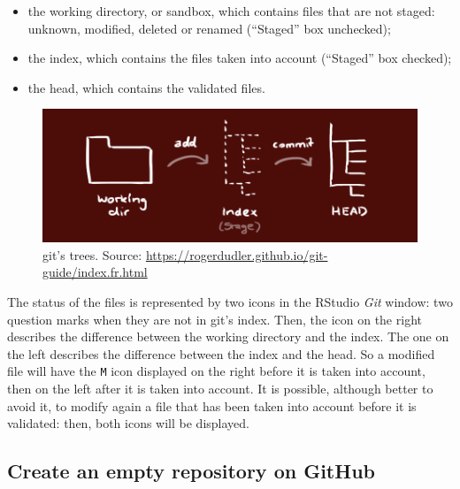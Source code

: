 \documentclass[
  12pt,
  american,
  a4paper,
  extrafontsizes,onecolumn,openright
  ]{memoir}
\providecommand{\tightlist}{%
  \setlength{\itemsep}{0pt}\setlength{\parskip}{0pt}}
\begin{document}
\begin{itemize}
\tightlist
\item
  the working directory, or sandbox, which contains files that are not staged: unknown, modified, deleted or renamed (\enquote{Staged} box unchecked);
\item
  the index, which contains the files taken into account (\enquote{Staged} box checked);
\item
  the head, which contains the validated files.
\end{itemize}



\scriptsize

\begin{figure}

{\centering \includegraphics[width=0.8\linewidth]{images/git-Trees} 

}

\caption{git's trees. Source: \url{https://rogerdudler.github.io/git-guide/index.fr.html}}\label{fig:git-Trees}
\end{figure}

\normalsize

The status of the files is represented by two icons in the RStudio \emph{Git} window: two question marks when they are not in git's index.
Then, the icon on the right describes the difference between the working directory and the index.
The one on the left describes the difference between the index and the head.
So a modified file will have the \texttt{M} icon displayed on the right before it is taken into account, then on the left after it is taken into account.
It is possible, although better to avoid it, to modify again a file that has been taken into account before it is validated: then, both icons will be displayed.

\hypertarget{create-an-empty-repository-on-github}{%
\subsection{Create an empty repository on GitHub}\label{create-an-empty-repository-on-github}}
\end{document}
